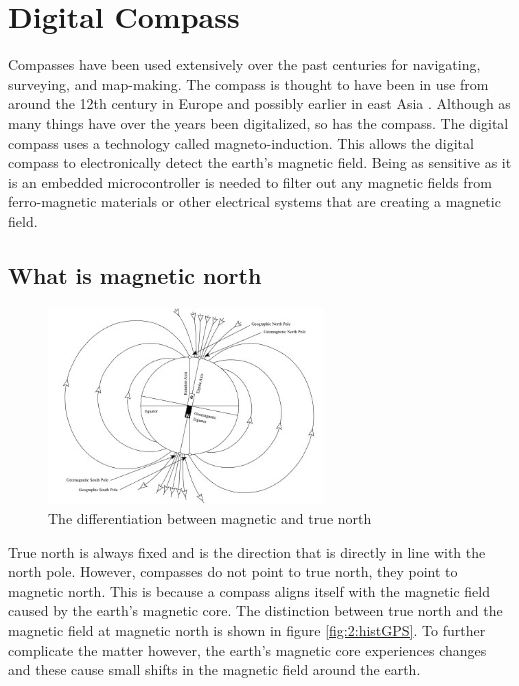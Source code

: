\section{Digital Compass}
Compasses have been used extensively over the past centuries for navigating, surveying, and map-making. The compass is thought to have been in use from around the 12th century in Europe and possibly earlier in east Asia \cite{Jones2019}. Although as many things have over the years been digitalized, so has the compass. The digital compass uses a technology called magneto-induction. This allows the digital compass to electronically detect the earth's magnetic field. Being as sensitive as it is an embedded microcontroller is needed to filter out any magnetic fields from ferro-magnetic materials or other electrical systems that are creating a magnetic field. \cite{AdvancedSafetyDevices2013}
\subsection{What is magnetic north}
\begin{figure}
	\begin{center}
		\includegraphics[width = 0.65\textwidth]{figures/tiltedDipole.jpg}
		\caption{The differentiation between magnetic and true north}
		\label{fig:2:magNorth}
	\end{center}
\end{figure}
True north is always fixed and is the direction that is directly in line with the north pole. However, compasses do not point to true north, they point to magnetic north. This is because a compass aligns itself with the magnetic field caused by the earth's magnetic core. The distinction between true north and the magnetic field at magnetic north is shown in figure \ref{fig:2:histGPS}. To further complicate the matter however, the earth's magnetic core experiences changes and these cause small shifts in the magnetic field around the earth. \cite{Jones2019}
